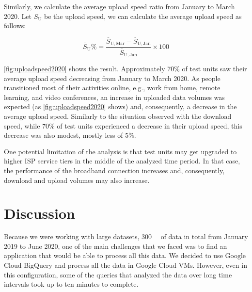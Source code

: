 \documentclass[conference,10pt]{IEEEtran}
\begin{document}
Similarly, we calculate the average upload speed ratio from January to March 2020. Let $S_{\text{U}}$ be the upload speed, we can calculate the average upload speed as follows:

\begin{equation}
\overline{S}_{\text{U}}\% = \frac{\overline{S}_{\text{U},\, \text{Mar}}-\overline{S}_{\text{U},\, \text{Jan}}}{\overline{S}_{\text{U},\, \text{Jan}}}\times 100
\end{equation}


\cref{fig:uploadspeed2020} shows the result. Approximately 70\% of test units saw their average upload speed decreasing from January to March 2020. As people transitioned most of their activities online, e.g., work from home, remote learning, and video conferences, an increase in uploaded data volumes was expected (as \cref{fig:uploadspeed2020} shows) and, consequently, a decrease in the average upload speed. Similarly to the situation observed with the download speed, while 70\% of test units experienced a decrease in their upload speed, this decrease was also modest, mostly less of 5\%.

One potential limitation of the analysis is that test units may get upgraded to higher \gls{ISP} service tiers in the middle of the analyzed time period. In that case, the performance of the broadband connection increases and, consequently, download and upload volumes may also increase.




\section{Discussion}\label{sec:discussion}

Because we were working with large datasets, \SI{300}{\giga\byte} of data in total from January 2019 to June 2020, one of the main challenges that we faced was to find an application that would be able to process all this data. We decided to use Google Cloud BigQuery and process all the data in Google Cloud \glspl{VM}. However, even in this configuration, some of the queries that analyzed the data over long time intervals took up to ten minutes to complete.
\end{document}
